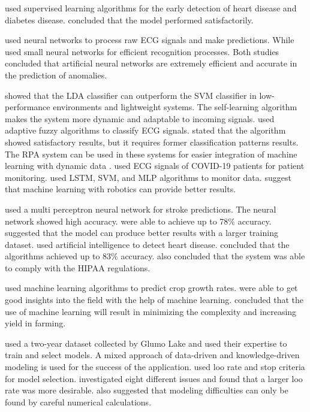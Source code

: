 \cite*{ref_paper_m2} used supervised learning algorithms for the early detection of heart disease and diabetes disease. \cite*{ref_paper_m2} concluded that the model performed satisfactorily.

\cite*{09_rp} used neural networks to process raw ECG signals and make predictions. While \cite*{22_rp} used small neural networks for efficient recognition processes. Both studies concluded that artificial neural networks are extremely efficient and accurate in the prediction of anomalies.

\cite*{06_rp} showed that the LDA classifier can outperform the SVM classifier in low-performance environments and lightweight systems. The self-learning algorithm makes the system more dynamic and adaptable to incoming signals. \cite*{14_rp} used adaptive fuzzy algorithms to classify ECG signals. \citeauthor{14_rp} stated that the algorithm showed satisfactory results, but it requires former classification patterns results. The RPA system can be used in these systems for easier integration of machine learning with dynamic data \cite*{ref_paper_self_rpa}. \cite*{21_rp} used ECG signals of COVID-19 patients for patient monitoring. \citeauthor{21_rp} used LSTM, SVM, and MLP algorithms to monitor data. \citeauthor{21_rp} suggest that machine learning with robotics can provide better results.

\cite*{07_rp} used a multi perceptron neural network for stroke predictions. The neural network showed high accuracy. \citeauthor{07_rp} were able to achieve up to 78\% accuracy. \citeauthor{07_rp} suggested that the model can produce better results with a larger training dataset. \cite*{05_rp} used artificial intelligence to detect heart disease. \citeauthor{05_rp} concluded that the algorithms achieved up to 83\% accuracy. \citeauthor{05_rp} also concluded that the system was able to comply with the HIPAA regulations.

\cite*{ref_paper_m3} used machine learning algorithms to predict crop growth rates. \citeauthor{ref_paper_m3} were able to get good insights into the field with the help of machine learning. \citeauthor{ref_paper_m3} concluded that the use of machine learning will result in minimizing the complexity and increasing yield in farming.

\cite*{01_rp} used a two-year dataset collected by Glumo Lake and used their expertise to train and select models. A mixed approach of data-driven and knowledge-driven modeling is used for the success of the application. \cite*{13_rp} used loo rate and stop criteria for model selection. \citeauthor{13_rp} investigated eight different issues and found that a larger loo rate was more desirable. \citeauthor{13_rp} also suggested that modeling difficulties can only be found by careful numerical calculations.


